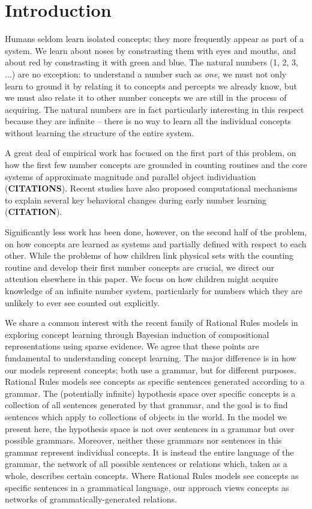 \documentclass[10pt,letterpaper]{article}
\begin{document}
\section{Introduction}

Humans seldom learn isolated concepts; they more frequently appear as
part of a system. We learn about noses by constrasting them with eyes
and mouths, and about red by constrasting it with green and blue. The
natural numbers (1, 2, 3, $\ldots$) are no exception: to understand a
number such as \emph{one}, we must not only learn to ground it by
relating it to concepts and percepts we already know, but we must also
relate it to other number concepts we are still in the process of
acquiring. The natural numbers are in fact particularly interesting in
this respect because they are infinite -- there is no way to learn all
the individual concepts without learning the structure of the entire
system.

A great deal of empirical work has focused on the first part of this
problem, on how the first few number concepts are grounded in counting
routines and the core systems of approximate magnitude and parallel
object individuation ({\bf CITATIONS}). Recent studies have also
proposed computational mechanisms to explain several key behavioral
changes during early number learning ({\bf CITATION}).

Significantly less work has been done, however, on the second half of
the problem, on how concepts are learned as systems and partially
defined with respect to each other. While the problems of how children
link physical sets with the counting routine and develop their first
number concepts are crucial, we direct our attention elsewhere in this
paper. We focus on how children might acquire knowledge of an infinite
number system, particularly for numbers which they are unlikely to
ever see counted out explicitly.

We share a common interest with the recent family of Rational Rules
models
\citep{goodman2008rational,T.D.Ullman:2012:1b1b6,PianGoodTen2012} in
exploring concept learning through Bayesian induction of compositional
representations using sparse evidence. We agree that these points are
fundamental to understanding concept learning. The major difference is
in how our models represent concepts; both use a grammar, but for
different purposes. Rational Rules models see concepts as specific
sentences generated according to a grammar. The (potentially infinite)
hypothesis space over specific concepts is a collection of all
sentences generated by that grammar, and the goal is to find sentences
which apply to collections of objects in the world. In the model we
present here, the hypothesis space is not over sentences in a grammar
but over possible grammars. Moreover, neither these grammars nor
sentences in this grammar represent individual concepts. It is instead
the entire language of the grammar, the network of all possible
sentences or relations which, taken as a whole, describes certain
concepts. Where Rational Rules models see concepts as specific
sentences in a grammatical language, our approach views concepts as
networks of grammatically-generated relations.
\end{document}
